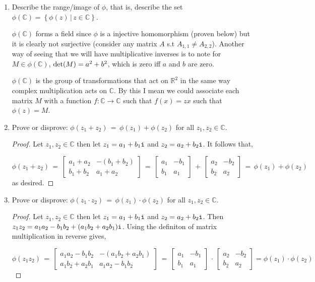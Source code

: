 \documentclass[11pt,table]{article}
\newcommand {\mat}  [1] {\left[\begin{array}{#1}}
\newcommand {\rix}      {\end{array}\right]}
\newcommand{\<}			{\langle}
\renewcommand{\>}      		{\rangle}
\def\det				{\mathop{\rm det}}
\newcommand{\bC}		{\mathbb{C}}
\newcommand{\bR}		{\mathbb{R}}
\begin{document}
\begin{enumerate}
\begin{enumerate}[\rm (a)]
\item 
Describe the range/image of $\phi$, that is, 
describe the set $\phi(\bC) = \left\{ \phi(z) \, | \, z \in \bC \right\}$. 

$\phi(\bC)$ forms a field since $\phi$ is a injective homomorphism (proven below) but it is clearly not surjective (consider any matrix $A$ s.t $A_{1,1} \neq A_{2,2}$). Another way of seeing that we will have multiplicative inverses is to note 
for $M \in \phi(\bC)$, $\det(M) = a^2 + b^2$, which is zero iff $a$ and $b$ are zero.  

$\phi(\bC)$ is the group of transformations that act on $\bR^2$ in the same way complex multiplication acts on $\bC$. By this I mean we could associate each matrix $M$ with a function $f:\bC \to \bC$ 
such that $f(x) = zx$  such that $\phi(z) = M$. 

\item 
Prove or disprove: $\phi (z_1 + z_2) \, = \, \phi(z_1) + \phi(z_2)$ 
for all $z_1, z_2 \in \bC$. 


\begin{proof}
	Let $z_1, z_2 \in \bC$ then let $z_1 = a_1 + b_1{\tt i}$ and $z_2 = a_2 + b_2{\tt i}$. 
	It follows that, 
	
	\begin{equation}
		\phi(z_1 + z_2) 
		\, = \, 
		\mat{rr}
		a_1 + a_2 & -(b_1 + b_2) \\
		b_1 + b_2 & a_1 + a_2
		\rix 
		\, = \, 
		\mat{rr}
		a_1 & -b_1 \\
		b_1 & a_1 
		\rix
		\, + \, 
		\mat{rr}
		a_2 & -b_2 \\
		b_2 & a_2
		\rix 
		\, = \, 
		\phi(z_1) + \phi(z_2)
	\end{equation}
	as desired. 
\end{proof}

\item 
Prove or disprove: $\phi (z_1 \cdot z_2) \, = \, \phi(z_1) \cdot \phi(z_2)$ 
for all $z_1, z_2 \in \bC$. 

\begin{proof}
	Let $z_1, z_2 \in \bC$ then let $z_1 = a_1 + b_1{\tt i}$ and $z_2 = a_2 + b_2{\tt i}$. 
	Then $z_1z_2 = a_1a_2 - b_1b_2 + (a_1b_2 + a_2b_1){\tt i}$. Using the definiton of matrix multiplication 
	in reverse gives,
	
	\begin{equation}
		\phi(z_1z_2) 
		\, = \, 
		\mat{rr}
		a_1a_2 - b_1b_2 & -(a_1b_2 + a_2b_1) \\
		a_1b_2 + a_2b_1 & a_1a_2 - b_1b_2 
		\rix 
		\, = \, 
		\mat{rr}
		a_1 & -b_1 \\ 
		b_1 & a_1 
		\rix 
		\, \cdot \, 
		\mat{rr}
		a_2 & -b_2 \\ 
		b_2 & a_2 
		\rix 
		= \phi(z_1) \cdot \phi(z_2)
	\end{equation}


\end{proof}
\end{enumerate}
\end{enumerate}
\end{document}
